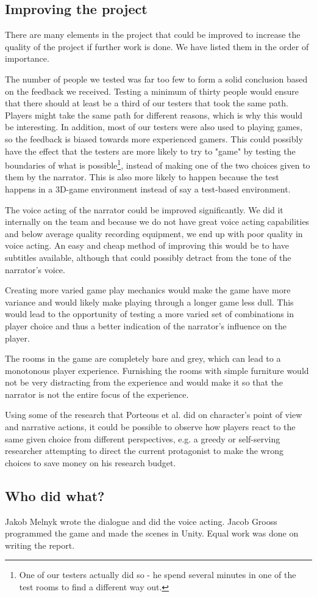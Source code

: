 \subsection{Improving the project}
There are many elements in the project that could be improved to increase the quality of the project if further work is done. We have listed them in the order of importance.

The number of people we tested was far too few to form a solid conclusion based on the feedback we received. Testing a minimum of thirty people would ensure that there should at least be a third of our testers that took the same path. Players might take the same path for different reasons, which is why this would be interesting. In addition, most of our testers were also used to playing games, so the feedback is biased towards more experienced gamers. This could possibly have the effect that the testers are more likely to try to "game" by testing the boundaries of what is possible\footnote{One of our testers actually did so - he spend several minutes in one of the test rooms to find a different way out.}, instead of making one of the two choices given to them by the narrator. This is also more likely to happen because the test happens in a 3D-game environment instead of say a test-based environment.

The voice acting of the narrator could be improved significantly. We did it internally on the team and because we do not have great voice acting capabilities and below average quality recording equipment, we end up with poor quality in voice acting. An easy and cheap method of improving this would be to have subtitles available, although that could possibly detract from the tone of the narrator's voice.

Creating more varied game play mechanics would make the game have more variance and would likely make playing through a longer game less dull. This would lead to the opportunity of testing a more varied set of combinations in player choice and thus a better indication of the narrator's influence on the player.

The rooms in the game are completely bare and grey, which can lead to a monotonous player experience. Furnishing the rooms with simple furniture would not be very distracting from the experience and would make it so that the narrator is not the entire focus of the experience.

Using some of the research that Porteous et al. \cite{Por} did on character's point of view and narrative actions, it could be possible to observe how players react to the same given choice from different perspectives, e.g. a greedy or self-serving researcher attempting to direct the current protagonist to make the wrong choices to save money on his research budget.

\subsection{Who did what?}
Jakob Melnyk wrote the dialogue and did the voice acting. Jacob Grooss programmed the game and made the scenes in Unity. Equal work was done on writing the report.